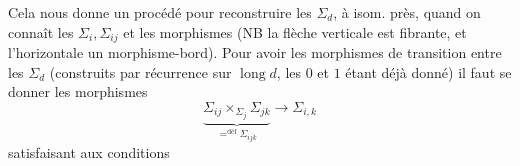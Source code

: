 Cela nous donne un procédé  pour
reconstruire les \(\Sigma_d\), à isom.  près,
quand on connaît les \(\Sigma_i,\Sigma_{ij}\)
 et les morphismes
(NB 
la flèche verticale est fibrante, et l'horizontale
un morphisme-bord). Pour avoir les
morphismes de transition entre les
\(\Sigma_d\) (construits par récurrence sur \(\operatorname{long}d\),
les \(0\) et \(1\) étant déjà donné) il faut se donner
les morphismes
\[
 \underbrace{\Sigma_{ij}\mathbin{\times_{\Sigma_j}}\Sigma_{jk}}
 _{\mathrel{\mathop=^{\mathrm{déf}}}\Sigma_{ijk}}
 \longrightarrow\Sigma_{i,k}
\]
satisfaisant aux conditions

